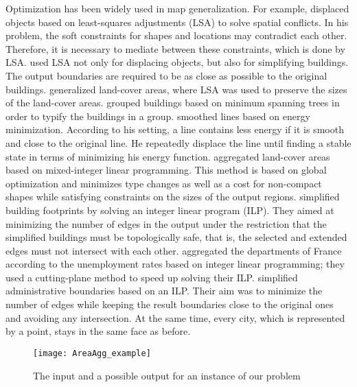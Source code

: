 \documentclass[acmsmall,natbib=false]{acmart}
\begin{document}
Optimization has been widely used in map generalization.
For example, \textcite{Harrie1999} displaced objects 
based on least-squares adjustments (LSA)
to solve spatial conflicts.
In his problem, the soft constraints 
for shapes and locations may contradict each other.
Therefore, it is necessary 
to mediate between these constraints, 
which is done by LSA.
\textcite{Sester2005Optimization} used LSA not only for 
displacing objects, but also for simplifying buildings. 
The output boundaries are required to 
be as close as possible to the original buildings.
\textcite{Tong2015AreaLSA} generalized land-cover areas,
where LSA was used to preserve the sizes of 
the land-cover areas.
\textcite{Regnauld2001} grouped buildings based on 
minimum spanning trees in order to typify
the buildings in a group.
\textcite{Burghardt2005Snakes} smoothed lines based on 
energy minimization. 
According to his setting, a line contains less energy
if it is smooth and close to the original line.
He repeatedly displace the line 
until finding a stable state 
in terms of minimizing his energy function.
\textcite{HaunertWolff2010AreaAgg} aggregated land-cover areas
based on mixed-integer linear programming.
This method is based on global optimization and minimizes 
type changes as well as a cost for non-compact shapes 
while satisfying constraints on the sizes of the output regions.
\textcite{Haunertwolff2010Building} simplified building
footprints by solving an integer linear program (ILP).
They aimed at minimizing the number of edges in the output under 
the restriction that the simplified buildings must be 
topologically safe,
that is, the selected and extended edges must not intersect with 
each other.
\textcite{Oehrlein2017Aggregation} aggregated the departments 
of France according to the unemployment rates based on integer 
linear programming; they used a cutting-plane method to 
speed up solving their ILP.
\textcite{Funke2017Simplification} simplified 
administrative boundaries based on an ILP.
Their aim was to minimize the number of edges
while keeping the result boundaries close to the original ones
and avoiding any intersection. 
At the same time, every city, which is represented by a point, stays in the same face as before.




\begin{figure}[tb]
\centering
\texttt{[image: AreaAgg\_example]}
\caption{The input and a possible output 
	for an instance of 	our problem}
\label{fig:AreaAgg_example}
\end{figure}
\end{document}
